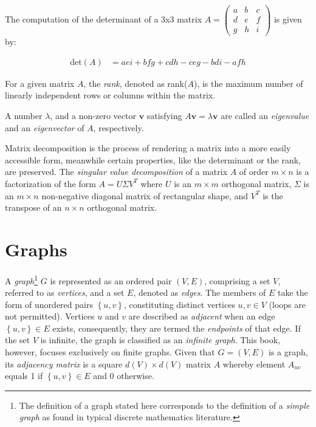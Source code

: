 \begin{example}
The computation of the determinant of a 3x3 matrix $A = \left( \begin{smallmatrix} a & b & c \\ d & e & f \\ g & h & i \end{smallmatrix} \right)$ is given by:

\begin{align*}
\text{det}(A) &= aei + bfg + cdh - ceg - bdi - afh
\end{align*}
\end{example}

For a given matrix $A$, the \emph{rank}, denoted as rank($A$), is the maximum number of linearly independent rows or columns within the matrix.

A number $\lambda$, and a non-zero vector $\mathbf{v}$ satisfying $A \mathbf{v} = \lambda \mathbf{v}$ are called an \emph{eigenvalue} and an \emph{eigenvector} of $A$, respectively.

Matrix decomposition is the process of rendering a matrix into a more easily accessible form, meanwhile certain properties, like the determinant or the rank, are preserved. The \emph{singular value decomposition} of a matrix $A$ of order $m \times n$ is a factorization of the form $A = U \Sigma V^T$ where $U$ is an $m \times m$ orthogonal matrix, $\Sigma$ is an $m \times n$ non-negative diagonal matrix of rectangular shape, and $V^T$ is the transpose of an $n \times n$ orthogonal matrix.

%
%

\section{Graphs}
\label{sec:Graphs}

A \emph{graph}\footnote{The definition of a graph stated here corresponds to the definition of a \emph{simple graph} as found in typical discrete mathematics literature.} $G$ is represented as an ordered pair $(V,E)$, comprising a set $V$, referred to as \emph{vertices}, and a set $E$, denoted as \emph{edges}. The members of $E$ take the form of unordered pairs $\left\{ u,v\right\}$, constituting distinct vertices $u,v\in V$ (loops are not permitted). Vertices $u$ and $v$ are described as \emph{adjacent} when an edge $\left\{ u,v\right\} \in E$ exists, consequently, they are termed the \emph{endpoints} of that edge. If the set $V$ is infinite, the graph is classified as an \emph{infinite graph}. This book, however, focuses exclusively on finite graphs. Given that $G = (V,E)$ is a graph, its \emph{adjacency matrix} is a square $d(V) \times d(V)$ matrix $A$ whereby element $A_{uv}$ equals 1 if $\left\{ u,v\right\} \in E$ and 0 otherwise.

